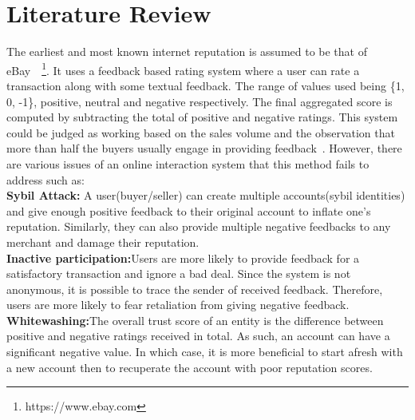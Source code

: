 \chapter{Literature Review}\label{ch:litrev}
The earliest and most known internet reputation is assumed to be that of
eBay~\cite{resnick2002trust}~\footnote{https://www.ebay.com}. It uses a
feedback based rating system where a user can rate a transaction along with
some textual feedback. The range of values used being \{1, 0, -1\}, positive,
neutral and negative respectively. The final aggregated score is computed by
subtracting the total of positive and negative ratings. This system could be
judged as working based on the sales volume and the observation that more than
half the buyers usually engage in providing feedback~\cite{resnick2006value}. 
However, there are various issues of an online interaction system that this
method fails to address such as: \\
\textbf{Sybil Attack:} A user(buyer/seller) can create multiple accounts(sybil
identities) and give enough positive feedback to their original account to
inflate one's reputation. Similarly, they can also provide multiple negative
feedbacks to any merchant and damage their reputation.\\
\textbf{Inactive participation:}Users are more likely to provide feedback for a
satisfactory transaction and ignore a bad deal. Since the system is not
anonymous, it is possible to trace the sender of received feedback. Therefore,
users are more likely to fear retaliation from giving negative feedback.\\ 
\textbf{Whitewashing:}The overall trust score of an entity is the difference
between positive and negative ratings received in total. As such, an account
can have a significant negative value. In which case, it is more beneficial to
start afresh with a new account then to recuperate the account with poor
reputation scores.\\

